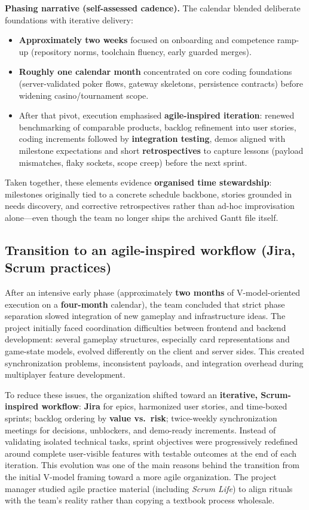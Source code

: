 \documentclass[11pt,a4paper]{article}
\begin{document}
\textbf{Phasing narrative (self-assessed cadence).} The calendar blended deliberate foundations with iterative delivery:

\begin{itemize}
\item \textbf{Approximately two weeks} focused on onboarding and competence ramp-up (repository norms, toolchain fluency, early guarded merges).
\item \textbf{Roughly one calendar month} concentrated on core coding foundations (server-validated poker flows, gateway skeletons, persistence contracts) before widening casino/tournament scope.
\item After that pivot, execution emphasised \textbf{agile-inspired iteration}: renewed benchmarking of comparable products, backlog refinement into user stories, coding increments followed by \textbf{integration testing}, demos aligned with milestone expectations and short \textbf{retrospectives} to capture lessons (payload mismatches, flaky sockets, scope creep) before the next sprint.
\end{itemize}

Taken together, these elements evidence \textbf{organised time stewardship}: milestones originally tied to a concrete schedule backbone, stories grounded in needs discovery, and corrective retrospectives rather than ad-hoc improvisation alone---even though the team no longer ships the archived Gantt file itself.

\subsection{Transition to an agile-inspired workflow (Jira, Scrum practices)}

After an intensive early phase (approximately \textbf{two months} of V-model-oriented execution on a \textbf{four-month} calendar), the team concluded that strict phase separation slowed integration of new gameplay and infrastructure ideas. The project initially faced coordination difficulties between frontend and backend development: several gameplay structures, especially card representations and game-state models, evolved differently on the client and server sides. This created synchronization problems, inconsistent payloads, and integration overhead during multiplayer feature development.

To reduce these issues, the organization shifted toward an \textbf{iterative, Scrum-inspired workflow}: \textbf{Jira} for epics, harmonized user stories, and time-boxed sprints; backlog ordering by \textbf{value vs.\ risk}; twice-weekly synchronization meetings for decisions, unblockers, and demo-ready increments. Instead of validating isolated technical tasks, sprint objectives were progressively redefined around complete user-visible features with testable outcomes at the end of each iteration. This evolution was one of the main reasons behind the transition from the initial V-model framing toward a more agile organization. The project manager studied agile practice material (including \textit{Scrum Life}) to align rituals with the team's reality rather than copying a textbook process wholesale.
\end{document}
